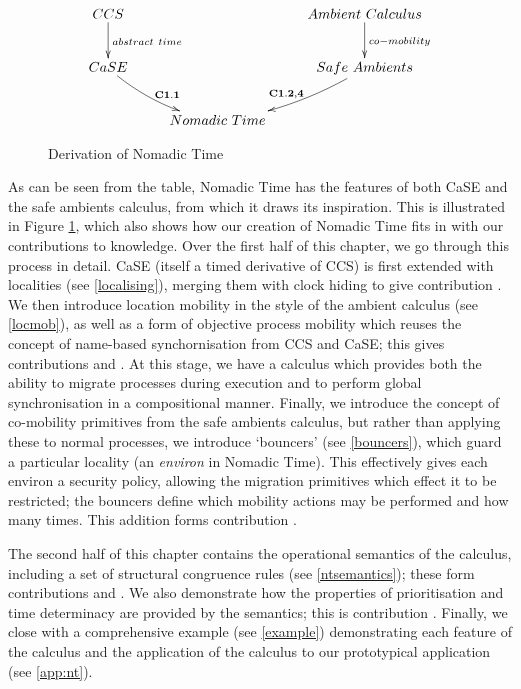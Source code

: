 \begin{figure}  
  \centering
\[\CompileMatrices
\xymatrix{
CCS \ar@{->}[d]^{abstract\ time} & &
Ambient\ Calculus \ar@{->}[d]^{co-mobility} \\ 
CaSE \ar@/_/[dr]^{\mathbf{C1.1}} & &
Safe\ Ambients \ar@/^/[dl]_{\mathbf{C1.2,4}} \\
& Nomadic\ Time & \\
}
\]
\caption{Derivation of Nomadic Time}
\label{fig:ntderiv}
\end{figure}

As can be seen from the table, Nomadic Time has the features of both
CaSE and the safe ambients calculus, from which it draws its
inspiration.  This is illustrated in Figure \ref{fig:ntderiv}, which
also shows how our creation of Nomadic Time fits in with our
contributions to knowledge. Over the first half of this chapter, we go
through this process in detail.  CaSE \cite{CaSE} (itself a timed
derivative of CCS) is first extended with localities (see
\ref{localising}), merging them with clock hiding to give contribution
.  We then introduce location mobility in the style of the
ambient calculus (see \ref{locmob}), as well as a form of objective
process mobility which reuses the concept of name-based
synchornisation from CCS and CaSE; this gives contributions 
and . At this stage, we have a calculus which provides both
the ability to migrate processes during execution and to perform
global synchronisation in a compositional manner.  Finally, we
introduce the concept of co-mobility primitives from the safe ambients
calculus, but rather than applying these to normal processes, we
introduce `bouncers' (see \ref{bouncers}), which guard a particular
locality (an \emph{environ} in Nomadic Time).  This effectively gives
each environ a security policy, allowing the migration primitives
which effect it to be restricted; the bouncers define which mobility
actions may be performed and how many times.  This addition forms
contribution .

The second half of this chapter contains the operational semantics of
the calculus, including a set of structural congruence rules (see
\ref{ntsemantics}); these form contributions  and
.  We also demonstrate how the properties of prioritisation
and time determinacy are provided by the semantics; this is
contribution .  Finally, we close with a comprehensive
example (see \ref{example}) demonstrating each feature of the calculus
and the application of the calculus to our prototypical application
(see \ref{app:nt}).

